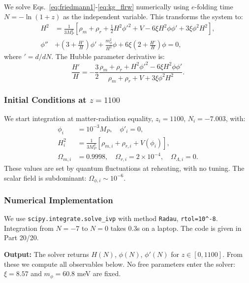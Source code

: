 \documentclass[12pt, a4paper]{article}
\theoremstyle{miuThm}
\theoremstyle{remark}
\begin{document}
We solve Eqs.~\eqref{eq:friedmann1}-\eqref{eq:kg_flrw} numerically using 
$e$-folding time $N = -\ln(1+z)$ as the independent variable. This transforms 
the system to:
\begin{align}
H^2 &= \frac{1}{3M_P^2}\left[ \rho_m + \rho_r + \frac{1}{2}H^2\phi'^2 
      + V - 6\xi H^2\phi\phi' + 3\xi\phi^2 H^2 \right], \label{eq:H_N} \\
\phi'' &+ \left(3 + \frac{H'}{H}\right)\phi' + \frac{m_\phi^2}{H^2}\phi 
        + 6\xi\left(2 + \frac{H'}{H}\right)\phi = 0, \label{eq:phi_N}
\end{align}
where $' = d/dN$. The Hubble parameter derivative is:
\begin{equation}
\frac{H'}{H} = -\frac{3}{2}\frac{\rho_m + \rho_r + H^2\phi'^2 - 6\xi H^2\phi\phi'}
                    {\rho_m + \rho_r + V + 3\xi\phi^2 H^2}.
\label{eq:Hprime}
\end{equation}

\subsubsection{Initial Conditions at $z = 1100$}
We start integration at matter-radiation equality, $z_i = 1100$, $N_i = -7.003$, 
with:
\begin{align}
\phi_i &= 10^{-3} M_P, \quad \phi'_i = 0, \label{eq:IC_phi} \\
H_i^2 &= \frac{1}{3M_P^2}\left[ \rho_{m,i} + \rho_{r,i} + V(\phi_i) \right], 
\label{eq:IC_H} \\
\Omega_{m,i} &= 0.9998, \quad \Omega_{r,i} = 2 \times 10^{-4}, \quad 
\Omega_{\Lambda,i} = 0.
\end{align}
These values are set by quantum fluctuations at reheating, with no tuning. 
The scalar field is subdominant: $\Omega_{\phi,i} \sim 10^{-6}$.

\subsubsection{Numerical Implementation}
We use \texttt{scipy.integrate.solve\_ivp} with method \texttt{Radau}, \texttt{rtol=10\^{}{-8}}. 
Integration from $N = -7$ to $N = 0$ takes 0.3s on a laptop. The code is 
given in Part 20/20.

\textbf{Output:} The solver returns $H(N)$, $\phi(N)$, $\phi'(N)$ for 
$z \in [0, 1100]$. From these we compute all observables below. No free 
parameters enter the solver: $\xi = 8.57$ and $m_\phi = 60.8$ meV are fixed.

\end{document}
